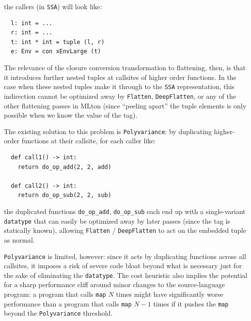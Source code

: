 \documentclass[leqno,11pt]{article}
\begin{document}
the callers (in \texttt{SSA}) will look like:
\begin{verbatim}
  l: int = ...
  r: int = ...
  t: int * int = tuple (l, r)
  e: Env = con xEnvLarge (t)
\end{verbatim}
The relevance of the closure conversion transformation to flattening, then, is
that it introduces further nested tuples at callsites of higher order functions.
In the case when these nested tuples make it through to the \texttt{SSA}
representation, this indirection cannot be optimized away by \texttt{Flatten},
\texttt{DeepFlatten}, or any of the other flattening passes in MLton (since
``peeling apart'' the tuple elements is only possible when we know the value of
the tag).

The existing solution to this problem is \texttt{Polyvariance}: by duplicating
higher-order functions at their callsite, for each caller like:
\begin{verbatim}
  def call1() -> int:
    return do_op_add(2, 2, add)

  def call2() -> int:
    return do_op_sub(2, 2, sub)
\end{verbatim}
the duplicated functions \texttt{do\_op\_add}, \texttt{do\_op\_sub} each end up
with a single-variant \texttt{datatype} that can easily be optimized away by
later passes (since the tag is statically known), allowing \texttt{Flatten} /
\texttt{DeepFlatten} to act on the embedded tuple as normal.

\texttt{Polyvariance} is limited, however: since it acts by duplicating
functions across all callsites, it imposes a risk of severe code bloat beyond
what is necessary just for the sake of eliminating the \texttt{datatype}. The
cost heuristic also implies the potential for a sharp performance cliff around
minor changes to the source-language program: a program that calls \texttt{map}
$N$ times might have significantly worse performance than a program that calls
\texttt{map} $N-1$ times if it pushes the \texttt{map} beyond the
\texttt{Polyvariance} threshold.






\end{document}
